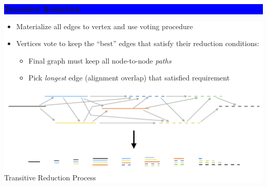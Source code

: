 \documentclass[11pt]{a0poster}
\begin{document}
{\begin{minipage}[t][2045pt][t]{\linewidth}
\begin{minipage}{0.6\linewidth}
\vspace{75pt}
\colorbox{Blue}{
\begin{minipage}[t]{\linewidth}
\vspace{30pt}
\begin{center}
\Huge \bf \color{White} Transitive Reduction
\end{center}
\vspace{17pt}
\end{minipage}
}
\colorbox{White}{
\begin{minipage}[t][470pt][t]{\linewidth}
\begin{minipage}{0.3\linewidth}
\LARGE
\color{Blue}
\begin{itemize}
\item Materialize all edges to vertex and use voting procedure
\item Vertices vote to keep the ``best'' edges that satisfy their reduction conditions:
\Large
\begin{itemize}
\item Final graph must keep all node-to-node \emph{paths}
\item Pick \emph{longest} edge (alignment overlap) that satisfied requirement
\end{itemize}
\end{itemize}
\end{minipage}
\begin{minipage}{0.03\linewidth}
\hfill
\pagebreak
\end{minipage}
\begin{minipage}{0.64\linewidth}
\color{Blue}
\begin{center}
\end{center}
\color{Blue}
\begin{center}
\vspace{20pt}
\includegraphics[width=0.9\linewidth]{transitive-reduction.pdf}
\\
Transitive Reduction Process
\end{center}
\end{minipage}
\end{minipage}
}


\end{minipage}
\end{minipage}}
\end{document}
